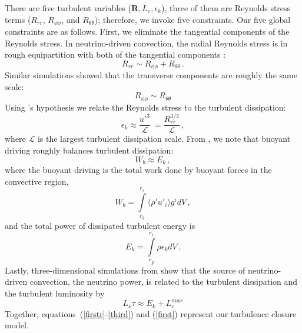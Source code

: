 \documentclass[twocolumn]{aastex6}
\begin{document}
There are five turbulent variables
  ($\textbf{R},L_e,\epsilon_k$), three of them are Reynolds stress
  terms ($R_{rr}$, $R_{\phi \phi}$, and $R_{\theta \theta}$);
  therefore, we invoke five constraints.
Our five global constraints are as follows. First,
    we eliminate the tangential components of the Reynolds stress.  In
  neutrino-driven convection, the radial Reynolds stress is in rough equipartition with both of the tangential components \citep{murphy13}:
\begin{equation}
R_{rr} \sim R_{\phi \phi} + R_{\theta \theta} \, .
\label{firstr}
\end{equation}
Similar simulations showed that the transverse components are roughly the same scale:
\begin{equation}
  R_{\phi \phi} \sim R_{\theta \theta}
  \label{secondr}
\end{equation}
Using \citet{kolm}'s hypothesis we relate the Reynolds stress
to the turbulent dissipation: 
\begin{equation}
\epsilon_k \approx \frac{u'^3}{\mathcal{L}} \ =
\frac{R_{rr}^{3/2}}{\mathcal{L}} \, ,
\label{second}
\end{equation}
where $\mathcal{L}$ is the largest turbulent dissipation scale.
From \citet{murphy11}, we note that buoyant driving roughly
  balances turbulent dissipation:
\begin{equation}
W_b \approx E_k \, ,
\label{third}
\end{equation}
where the buoyant driving is the total work done by buoyant
  forces in the convective region,
\begin{equation}
W_b  = \int\limits_{r_g}^{r_s} \langle \rho' u'_i \rangle g^i dV \, ,
\label{wb}
\end{equation}
and the total power of dissipated turbulent energy is
\begin{equation}
\label{eq:Ekdefine}
E_k = \int\limits_{r_g}^{r_s} \rho \epsilon_k dV \, .
\end{equation}
Lastly, three-dimensional simulations from \citet{murphy13} show that the source of neutrino-driven convection, the neutrino power, is related to the turbulent dissipation and the turbulent luminosity by
\begin{equation} 
L_\nu \tau \approx E_k + L_e^{max} 
\label{first}
\end{equation}
Together, equations~(\ref{firstr}-\ref{third}) and (\ref{first}) represent our turbulence closure model.
\end{document}

